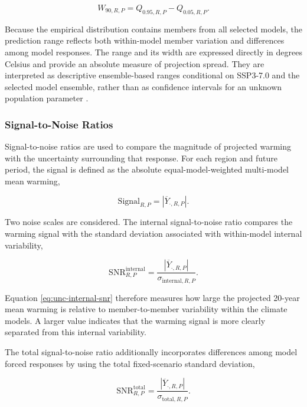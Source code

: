 \documentclass[
]{krantz}
\begin{document}
\[
W_{90,R,P}
=
Q_{0.95,R,P}
-
Q_{0.05,R,P}.
\]

Because the empirical distribution contains members from all selected models, the prediction range reflects both within-model member variation and differences among model responses. The range and its width are expressed directly in degrees Celsius and provide an absolute measure of projection spread. They are interpreted as descriptive ensemble-based ranges conditional on SSP3-7.0 and the selected model ensemble, rather than as confidence intervals for an unknown population parameter \citep{Tebaldi2007}.

\subsubsection{Signal-to-Noise Ratios}\label{signal-to-noise-ratios}

Signal-to-noise ratios are used to compare the magnitude of projected warming with the uncertainty surrounding that response. For each region and future period, the signal is defined as the absolute equal-model-weighted multi-model mean warming,

\[
\mathrm{Signal}_{R,P}
=
\left|
\overline{Y}_{\cdot,R,P}
\right|.
\]

Two noise scales are considered. The internal signal-to-noise ratio compares the warming signal with the standard deviation associated with within-model internal variability,

\begin{equation}
\mathrm{SNR}^{\mathrm{internal}}_{R,P}
=
\frac{
\left|
\overline{Y}_{\cdot,R,P}
\right|
}{
\sigma_{\mathrm{internal},R,P}
}.
\label{eq:unc-internal-snr}
\end{equation}

Equation \eqref{eq:unc-internal-snr} therefore measures how large the projected 20-year mean warming is relative to member-to-member variability within the climate models. A larger value indicates that the warming signal is more clearly separated from this internal variability.

The total signal-to-noise ratio additionally incorporates differences among model forced responses by using the total fixed-scenario standard deviation,

\begin{equation}
\mathrm{SNR}^{\mathrm{total}}_{R,P}
=
\frac{
\left|
\overline{Y}_{\cdot,R,P}
\right|
}{
\sigma_{\mathrm{total},R,P}
}.
\label{eq:unc-total-snr}
\end{equation}
\end{document}
